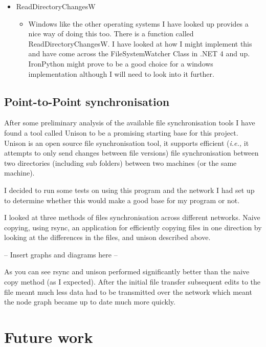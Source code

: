\documentclass[12pt]{article}
\begin{document}
\begin{itemize}
    \item ReadDirectoryChangesW
        \begin{itemize}
        \item Windows like the other operating systems
        I have looked up provides a nice way of doing this
        too. There is a function called ReadDirectoryChangesW.
        I have looked at how I might implement this and have
        come across the FileSystemWatcher Class in .NET 4 and
        up. IronPython might prove to be a good choice for a
        windows implementation although I will need to look
        into it further.
        \end{itemize}
\end{itemize}

\subsection{Point-to-Point synchronisation}
After some preliminary analysis of the available file synchronisation
tools I have found a tool called Unison to be a promising starting
base for this project. Unison is an open source file synchronisation tool,
it supports efficient (\emph{i.e.,} it attempts to only send changes between file versions) file synchronisation between two
directories (including sub folders) between two machines (or the same
machine).

I decided to run some tests on using this program and the network
I had set up to determine whether this would make a good base for
my program or not.

I looked at three methods of files synchronisation across
different networks. Naive copying, using rsync, an application
for efficiently copying files in one direction by looking at
the differences in the files, and unison described above.

-- Insert graphs and diagrams here --

As you can see rsync and unison performed significantly better
than the naive copy method (as I expected). After the initial file
transfer subsequent edits to the file meant much less data had to
be transmitted over the network which meant the node graph
became up to date much more quickly.


\section{Future work}
\end{document}

